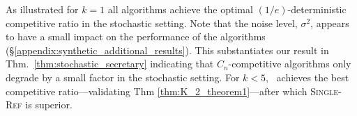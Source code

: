 As illustrated for $k=1$ all algorithms achieve the optimal $(1/e)$-deterministic competitive ratio in the stochastic setting. Note that the noise level, $\sigma^2$, appears to have a small impact on the performance of the algorithms (\S\ref{appendix:synthetic_additional_results}). 
This substantiates our result in Thm.~\ref{thm:stochastic_secretary} indicating that $C_n$-competitive algorithms only degrade by a small factor in the stochastic setting. For $k<5$, \algoname\ achieves the best competitive ratio---validating Thm \ref{thm:K_2_theorem1}---after which \textsc{Single-Ref} is superior.
